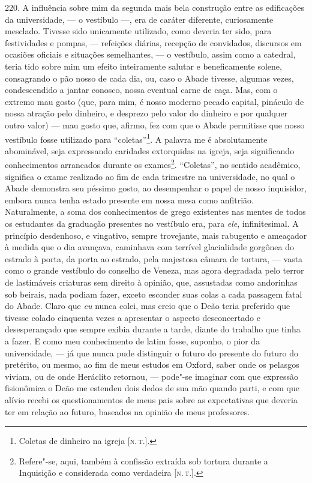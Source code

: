 220. A influência sobre mim da segunda mais bela construção entre as
edificações da universidade, --- o vestíbulo ---, era de caráter
diferente, curiosamente mesclado. Tivesse sido unicamente utilizado,
como deveria ter sido, para festividades e pompas, --- refeições diárias,
recepção de convidados, discursos em ocasiões oficiais e situações
semelhantes, --- o vestíbulo, assim como a catedral, teria tido sobre mim
um efeito inteiramente salutar e beneficamente solene, consagrando o pão
nosso de cada dia, ou, caso o Abade tivesse, algumas vezes,
condescendido a jantar conosco, nossa eventual carne de caça. Mas, com o
extremo mau gosto (que, para mim, é nosso moderno pecado capital,
pináculo de nossa atração pelo dinheiro, e desprezo pelo valor do
dinheiro e por qualquer outro valor) --- mau gosto que, afirmo, fez com
que o Abade permitisse que nosso vestíbulo fosse utilizado para
``coletas''\footnote{Coletas de dinheiro na igreja {[}\textsc{n.\,t.}{]}.}. A
palavra me é absolutamente abominável, seja expressando caridades
extorquidas na igreja, seja significando conhecimentos arrancados
durante os exames\footnote{Refere"-se, aqui, também à confissão extraída
  sob tortura durante a Inquisição e considerada como verdadeira {[}\textsc{n.\,t.}{]}.}. ``Coletas'', no sentido acadêmico, significa o exame
realizado ao fim de cada trimestre na universidade, no qual o Abade
demonstra seu péssimo gosto, ao desempenhar o papel de nosso inquisidor,
embora nunca tenha estado presente em nossa mesa como anfitrião.
Naturalmente, a soma dos conhecimentos de grego existentes nas mentes de
todos os estudantes da graduação presentes no vestíbulo era, para
\emph{ele}, infinitesimal. A princípio desdenhoso, e vingativo, sempre
trovejante, mais rabugento e ameaçador à medida que o dia avançava,
caminhava com terrível glacialidade gorgônea do estrado à porta, da
porta ao estrado, pela majestosa câmara de tortura, --- vasta como o
grande vestíbulo do conselho de Veneza, mas agora degradada pelo terror
de lastimáveis criaturas sem direito à opinião, que, assustadas como
andorinhas sob beirais, nada podiam fazer, exceto esconder suas colas a
cada passagem fatal do Abade. Claro que \emph{eu} nunca colei, mas creio
que o Deão teria preferido que tivesse colado cinquenta vezes a
apresentar o aspecto desconcertado e desesperançado que sempre exibia
durante a tarde, diante do trabalho que tinha a fazer. E como meu
conhecimento de latim fosse, suponho, o pior da universidade, --- já que
nunca pude distinguir o futuro do presente do futuro do pretérito, ou
mesmo, ao fim de meus estudos em Oxford, saber onde os pelasgos viviam,
ou de onde Heráclito retornou, --- pode"-se imaginar com que expressão
fisionômica o Deão me estendeu dois dedos de sua mão quando parti, e com
que alívio recebi os questionamentos de meus pais sobre as expectativas
que deveria ter em relação ao futuro, baseados na opinião de meus
professores.

